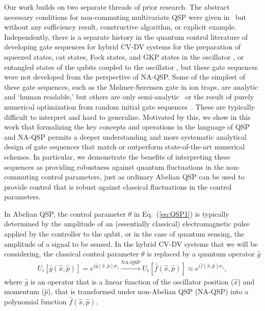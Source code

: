\documentclass[aps,prx,showpacs,notitlepage,twocolumn,superscriptaddress,nofootinbib,preprintnumbers,floatfix,10pt, longbibliography]{revtex4-2}
\begin{document}
Our work builds on two separate threads of prior research. The abstract necessary conditions for non-commuting multivariate QSP were given in~\cite{nemeth2023variants} but without any sufficiency result, constructive algorithm, or explicit example. Independently, there is a separate history in the quantum control literature of developing gate sequences for hybrid CV-DV systems 
for the preparation of squeezed states, cat states, Fock states, and GKP states in the oscillator \cite{hastrup2021measurement,hastrup2021unconditional,hastrup2022universal,eickbusch2022fast,fluhmann2019encoding,de2022error,rojkov2023two,campagne2020quantum,sivak2023real,matsos_universal_2025,PhysRevLett.133.050602}, or entangled states of the qubits coupled to the oscillator \cite{M-S-gate1,M-S-gate2}, but these gate sequences were not developed from the perspective of NA-QSP. Some of the simplest of these gate sequences, such as the Mølmer-Sørensen gate \cite{M-S-gate1,M-S-gate2} in ion traps, are analytic and `human readable,' but others are only semi-analytic~\cite{hastrup2021measurement,hastrup2021unconditional,hastrup2022universal} or the result of purely numerical optimization from random initial gate sequences~\cite{eickbusch2022fast}.  These are typically difficult to interpret and hard to generalize. Motivated by this, we show in this work that formalizing the key concepts and operations in the language of QSP and NA-QSP permits a deeper understanding and more systematic analytical design of gate sequences that match or outperform state-of-the-art numerical schemes.   In particular, we demonstrate the benefits of interpreting these sequences as providing robustness against quantum fluctuations in the non-commuting control parameters, just as ordinary Abelian QSP can be used to provide control that is robust against classical fluctuations in the control parameters.

In Abelian QSP, the control parameter $\theta$ in Eq.~(\ref{eq:QSP1}) is typically determined by the amplitude of an (essentially classical) electromagnetic pulse applied by the controller to the qubit, or in the case of quantum sensing, the amplitude of a signal to be sensed.  In the hybrid CV-DV systems that we will be considering, the classical control parameter $\theta$ is replaced by a quantum operator $\hat g$
\begin{align}
U_i[\hat g(\hat x, \hat p)]=e^{i\hat g(\hat x, \hat p) \sigma_z}\xrightarrow{\textrm{NA-QSP}}U_\mathrm{t}[\hat f(\hat x, \hat p)]\approx e^{i\hat f(\hat x, \hat p) \sigma_z},\label{eq:U[g]}
\end{align}
where $\hat g$ is an operator that is a linear function of the oscillator position ($\hat x$) and momentum ($\hat p$), that is transformed under non-Abelian QSP (NA-QSP) into a polynomial function $\hat f(\hat x,\hat p)$.
\end{document}
